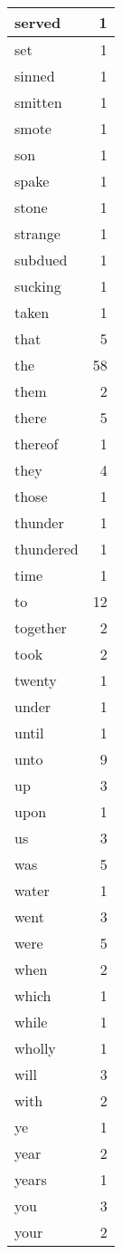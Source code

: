\begin{center}
\begin{longtable}{l|r}
served & 1 \\ \hline
set & 1 \\ \hline
sinned & 1 \\ \hline
smitten & 1 \\ \hline
smote & 1 \\ \hline
son & 1 \\ \hline
spake & 1 \\ \hline
stone & 1 \\ \hline
strange & 1 \\ \hline
subdued & 1 \\ \hline
sucking & 1 \\ \hline
taken & 1 \\ \hline
that & 5 \\ \hline
the & 58 \\ \hline
them & 2 \\ \hline
there & 5 \\ \hline
thereof & 1 \\ \hline
they & 4 \\ \hline
those & 1 \\ \hline
thunder & 1 \\ \hline
thundered & 1 \\ \hline
time & 1 \\ \hline
to & 12 \\ \hline
together & 2 \\ \hline
took & 2 \\ \hline
twenty & 1 \\ \hline
under & 1 \\ \hline
until & 1 \\ \hline
unto & 9 \\ \hline
up & 3 \\ \hline
upon & 1 \\ \hline
us & 3 \\ \hline
was & 5 \\ \hline
water & 1 \\ \hline
went & 3 \\ \hline
were & 5 \\ \hline
when & 2 \\ \hline
which & 1 \\ \hline
while & 1 \\ \hline
wholly & 1 \\ \hline
will & 3 \\ \hline
with & 2 \\ \hline
ye & 1 \\ \hline
year & 2 \\ \hline
years & 1 \\ \hline
you & 3 \\ \hline
your & 2 \\ \hline
\end{longtable}
\end{center}



